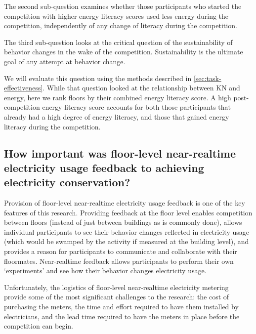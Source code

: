 The second sub-question examines whether those participants who started the competition with higher energy literacy scores used less energy during the competition, independently of any change of literacy during the competition.

The third sub-question looks at the critical question of the sustainability of behavior changes in the wake of the competition. Sustainability is the ultimate goal of any attempt at behavior change.

We will evaluate this question using the methods described in \autoref{sec:task-effectiveness}. While that question looked at the relationship between KN and energy, here we rank floors by their combined energy literacy score. A high post-competition energy literacy score accounts for both those participants that already had a high degree of energy literacy, and those that gained energy literacy during the competition.

\subsection[How important was floor-level near-realtime feedback?]{How important was floor-level near-realtime electricity usage feedback to achieving electricity conservation?}

Provision of floor-level near-realtime electricity usage feedback is one of the key features of this research. Providing feedback at the floor level enables competition between floors (instead of just between buildings as is commonly done), allows individual participants to see their behavior changes reflected in electricity usage (which would be swamped by the activity if measured at the building level), and provides a reason for participants to communicate and collaborate with their floormates. Near-realtime feedback allows participants to perform their own `experiments' and see how their behavior changes electricity usage.

Unfortunately, the logistics of floor-level near-realtime electricity metering provide some of the most significant challenges to the research: the cost of purchasing the meters, the time and effort required to have them installed by electricians, and the lead time required to have the meters in place before the competition can begin.


